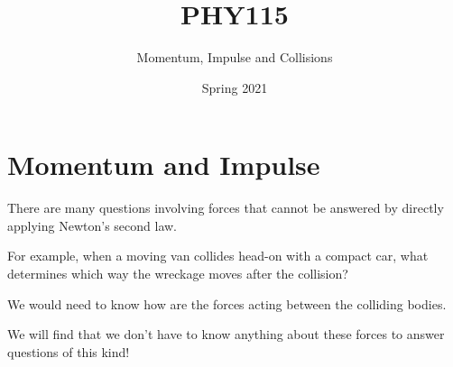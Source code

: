 \documentclass[]{beamer}
\title{PHY115}    %
\author{Momentum, Impulse and Collisions}                 %
\institute{Digipen}      %
\date{Spring 2021}
\begin{document}
\begin{frame}
  \titlepage
\end{frame}

\section[]{}

\begin{frame}
  \tableofcontents
\end{frame}

\section{Momentum and Impulse}

\begin{frame}


There are many questions involving forces that cannot be answered by
directly applying Newton’s second law. 

\pause
\vspace{3mm}


For example, when a moving van collides head-on with a compact car, what determines which
way the wreckage moves after the collision?


\pause
\vspace{3mm}

We would need to know how are the forces acting between the colliding bodies.
\pause
\vspace{3mm}


We will find  that we don’t have to know anything about these forces to answer
questions of this kind!

    
\end{frame}


\end{document}
